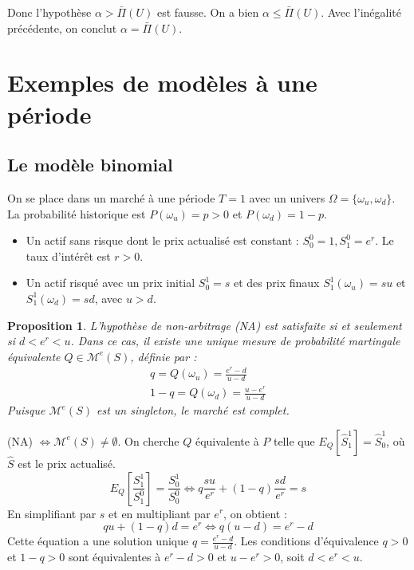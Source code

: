 \documentclass[12pt,a4paper]{article}
\makeatletter
\numberwithin{equation}{section}
\theoremstyle{plain} %
\newtheorem{proposition}{Proposition}
\theoremstyle{definition} %
\theoremstyle{remark} %
\theoremstyle{myexample}
\theoremstyle{definition}
\renewenvironment{proof}[1][\proofname]{%
  \par\vspace{0.8em}%
  \pushQED{\qed}%
  \normalfont\color{cyan}%
  \topsep6\p@\@plus6\p@\relax
  \trivlist
  \item[\hskip\labelsep\bfseries\color{cyan}#1\@addpunct{.}]\ignorespaces
}{%
  \popQED\endtrivlist\vspace{0.8em}%
}
\makeatother
\begin{document}
\begin{proof}
\begin{enumerate}
    Donc l'hypothèse $\alpha > \bar\Pi(U)$ est fausse. On a bien $\alpha \leq \bar\Pi(U)$.
    Avec l'inégalité précédente, on conclut $\alpha = \bar\Pi(U)$.
\end{enumerate}
\end{proof}


\section{Exemples de modèles à une période}

\subsection{Le modèle binomial}
On se place dans un marché à une période $T=1$ avec un univers $\Omega = \{\omega_u, \omega_d\}$. La probabilité historique est $P(\omega_u)=p > 0$ et $P(\omega_d)=1-p$.
\begin{itemize}
    \item Un actif sans risque dont le prix actualisé est constant : $S_0^0 = 1, S_1^0 = e^r$. Le taux d'intérêt est $r > 0$.
    \item Un actif risqué avec un prix initial $S_0^1=s$ et des prix finaux $S_1^1(\omega_u) = su$ et $S_1^1(\omega_d) = sd$, avec $u > d$.
\end{itemize}

\begin{proposition}
L'hypothèse de non-arbitrage (NA) est satisfaite si et seulement si $d < e^r < u$.
Dans ce cas, il existe une unique mesure de probabilité martingale équivalente $Q \in \mathcal{M}^e(S)$, définie par :
\begin{align*}
    q = Q(\omega_u) = \frac{e^r - d}{u - d} \\
    1-q = Q(\omega_d) = \frac{u - e^r}{u - d}
\end{align*}
Puisque $\mathcal{M}^e(S)$ est un singleton, le marché est complet.
\end{proposition}

\begin{proof}
(NA) $\iff \mathcal{M}^e(S) \neq \emptyset$. On cherche $Q$ équivalente à $P$ telle que $E_Q[\hat{S}_1^1] = \hat{S}_0^1$, où $\hat{S}$ est le prix actualisé.
\[
E_Q\left[\frac{S_1^1}{S_1^0}\right] = \frac{S_0^1}{S_0^0} \iff q \frac{su}{e^r} + (1-q) \frac{sd}{e^r} = s
\]
En simplifiant par $s$ et en multipliant par $e^r$, on obtient :
\[
q u + (1-q) d = e^r \iff q(u-d) = e^r - d
\]
Cette équation a une solution unique $q = \frac{e^r - d}{u - d}$. Les conditions d'équivalence $q>0$ et $1-q>0$ sont équivalentes à $e^r-d>0$ et $u-e^r>0$, soit $d < e^r < u$.
\end{proof}
\end{document}
